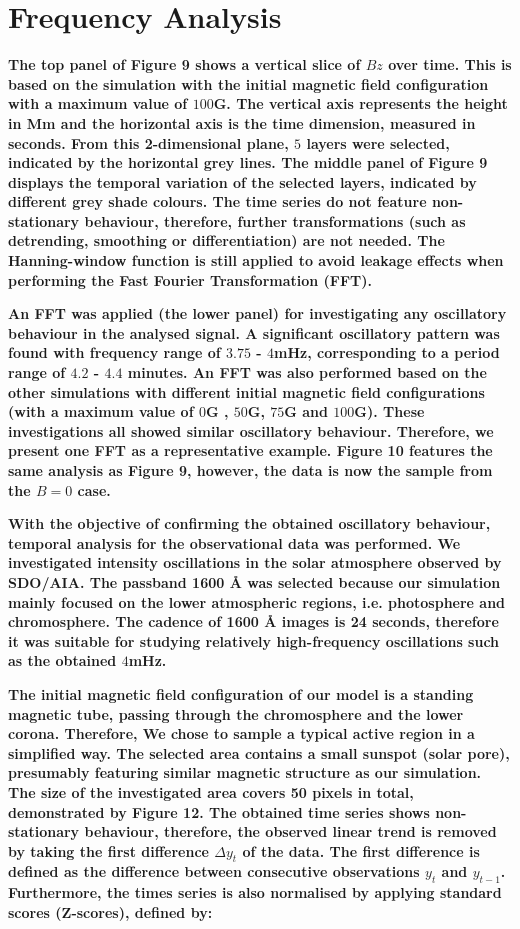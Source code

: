\documentclass[linenumbers]{aastex63}
\newcommand{\bcr}{\bf\color{red}} %
\begin{document}
\section{Frequency Analysis}

{\bcr
The top panel of Figure 9 shows a vertical slice of $Bz$ over time. This is based on the simulation with the initial magnetic field configuration with a maximum value of $100$G. The vertical axis represents the height in Mm and the horizontal axis is the time dimension, measured in seconds. From this 2-dimensional plane, $5$ layers were selected, indicated by the horizontal grey lines. The middle panel of Figure 9 displays the temporal variation of the selected layers, indicated by different grey shade colours. The time series do not feature non-stationary behaviour, therefore, further transformations (such as detrending, smoothing or differentiation) are not needed. The Hanning-window function is still applied to avoid leakage effects when performing the Fast Fourier Transformation (FFT).  
}

{\bcr
An FFT was applied (the lower panel) for investigating any oscillatory behaviour in the analysed signal. A significant oscillatory pattern was found with frequency range of $3.75$ - $4$mHz, corresponding to a period range of $4.2$ - $4.4$ minutes. An FFT was also performed based on the other simulations with different initial magnetic field configurations (with a maximum value of $0$G , $50$G,  $75$G  and $100$G). These investigations all showed similar oscillatory behaviour. Therefore, we present one FFT as a representative example. Figure 10 features the same analysis as Figure 9, however, the data is now the sample from the $B=0$ case.
}

{\bcr
With the objective of confirming  the obtained oscillatory behaviour, temporal analysis for the observational data was performed. We investigated intensity oscillations in the solar atmosphere observed by SDO/AIA. The passband 1600 {\AA} was selected because our simulation mainly focused on the lower atmospheric regions, i.e. photosphere and chromosphere. The cadence of 1600 {\AA} images is 24 seconds, therefore it was suitable for studying relatively high-frequency oscillations such as the obtained $4$mHz.
}

{\bcr
The initial magnetic field configuration of our model is a standing magnetic tube, passing through the chromosphere and the lower corona. Therefore, We chose to sample a typical active region in a simplified way. The selected area contains a small sunspot (solar pore), presumably featuring similar magnetic structure as our simulation.  The size of the investigated area covers 50 pixels in total, demonstrated by Figure 12. The obtained time series shows non-stationary behaviour, therefore, the observed linear trend is removed by taking the first difference $\Delta  y_{t}$ of the data. The first difference is defined as the difference between consecutive observations $y_{t}$ and $y_{t-1}$. Furthermore, the times series is also normalised by applying standard scores (Z-scores), defined by:
}
\end{document}
